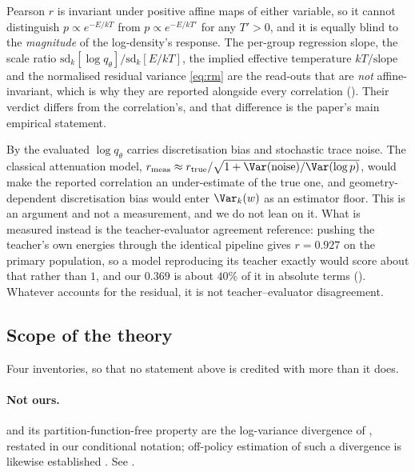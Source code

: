 \begin{remark}
\label{rem:affine}
Pearson $r$ is invariant under positive affine maps of either variable, so it
cannot distinguish $p \propto e^{-E/kT}$ from $p \propto e^{-E/kT'}$ for any
$T' > 0$, and it is equally blind to the \emph{magnitude} of the log-density's
response. The per-group regression slope, the scale ratio
$\mathrm{sd}_k[\log q_\theta]/\mathrm{sd}_k[E/kT]$, the implied effective
temperature $kT/\mathrm{slope}$ and the normalised residual variance
\eqref{eq:rm} are the read-outs that are \emph{not} affine-invariant, which is why
they are reported alongside every correlation (). Their verdict
differs from the correlation's, and that difference is the paper's main empirical
statement.
\end{remark}

\begin{remark}
\label{rem:attenuation}
By  the evaluated $\log q_\theta$ carries discretisation bias and
stochastic trace noise. The classical attenuation model,
$r_{\mathrm{meas}} \approx r_{\mathrm{true}}/\sqrt{1 + \Var(\text{noise})/\Var(\log p)}$,
would make the reported correlation an under-estimate of the true one, and
geometry-dependent discretisation bias would enter $\Var_k(w)$ as an estimator
floor. This is an argument and not a measurement, and we do not lean on it. What is
measured instead is the teacher-evaluator agreement
reference: pushing the teacher's own energies through the identical pipeline gives
$r = 0.927$ on the primary population, so a model reproducing its teacher exactly
would score about that rather than $1$, and our $0.369$ is about $40\%$ of it in
absolute terms (). Whatever accounts for the residual, it is
not teacher--evaluator disagreement.
\end{remark}

\subsection{Scope of the theory}
\label{app:scope}

Four inventories, so that no statement above is credited with more than it does.

\paragraph{Not ours.}  and its partition-function-free
property are the log-variance divergence of
\citet{vargrad,nusken2021pathspace,richter2024improvedsampling}, restated in our
conditional notation; off-policy estimation of such a divergence is likewise
established \citep{sendera2024offpolicy}. See .

